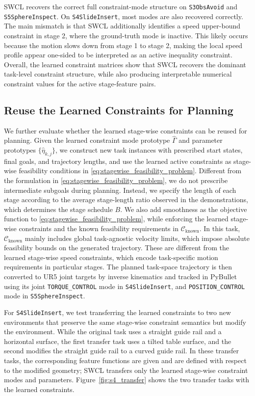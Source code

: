 \documentclass[lettersize,journal]{IEEEtran}
\begin{document}
SWCL recovers the correct full constraint-mode structure on \texttt{S3ObsAvoid} and \texttt{S5SphereInspect}. On \texttt{S4SlideInsert}, most modes are also recovered correctly. The main mismatch is that SWCL additionally identifies a speed upper-bound constraint in stage 2, where the ground-truth mode is inactive. This likely occurs because the motion slows down from stage 1 to stage 2, making the local speed profile appear one-sided to be interpreted as an active inequality constraint. Overall, the learned constraint matrices show that SWCL recovers the dominant task-level constraint structure, while also producing interpretable numerical constraint values for the active stage-feature pairs.

\subsection{Reuse the Learned Constraints for Planning}
\label{subsec:planning_learned_constraints}
We further evaluate whether the learned stage-wise constraints can be reused for planning. Given the learned constraint mode prototype $\hat\Gamma$ and parameter prototypes $\{\hat\eta_{k,j}\}$, we construct new task instances with prescribed start states, final goals, and trajectory lengths, and use the learned active constraints as stage-wise feasibility conditions in \eqref{eq:stagewise_feasibility_problem}. Different from the formulation in \eqref{eq:stagewise_feasibility_problem}, we do not prescribe intermediate subgoals during planning. Instead, we specify the length of each stage according to the average stage-length ratio observed in the demonstrations, which determines the stage schedule $B$. We also add smoothness as the objective function to \eqref{eq:stagewise_feasibility_problem}, while enforcing the learned stage-wise constraints and the known feasibility requirements in $\mathcal{C}_{\mathrm{known}}$. In this task, $\mathcal{C}_{\mathrm{known}}$ mainly includes global task-agnostic velocity limits, which impose absolute feasibility bounds on the generated trajectory. These are different from the learned stage-wise speed constraints, which encode task-specific motion requirements in particular stages. The planned task-space trajectory is then converted to UR5 joint targets by inverse kinematics and tracked in PyBullet using its joint \texttt{TORQUE\_CONTROL} mode in \texttt{S4SlideInsert}, and  \texttt{POSITION\_CONTROL} mode in \texttt{S5SphereInspect}.

For \texttt{S4SlideInsert}, we test transferring the learned constraints to two new environments that preserve the same stage-wise constraint semantics but modify the environment. While the original task uses a straight guide rail and a horizontal surface, the first transfer task uses a tilted table surface, and the second modifies the straight guide rail to a curved guide rail. In these transfer tasks, the corresponding feature functions are given and are defined with respect to the modified geometry; SWCL transfers only the learned stage-wise constraint modes and parameters. Figure~\ref{fig:s4_transfer} shows the two transfer tasks with the learned constraints.
\end{document}
